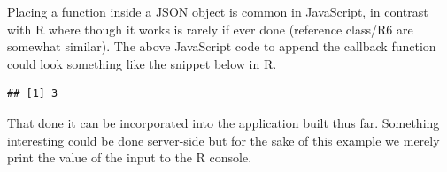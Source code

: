 \documentclass[
]{krantz}
\makeatletter
\newenvironment{Shaded}{\begin{snugshade}}{\end{snugshade}}
\newcommand{\ControlFlowTok}[1]{\textcolor[rgb]{0.27,0.27,0.27}{\textbf{#1}}}
\newcommand{\DataTypeTok}[1]{\textcolor[rgb]{0.27,0.27,0.27}{#1}}
\newcommand{\DecValTok}[1]{\textcolor[rgb]{0.06,0.06,0.06}{#1}}
\newcommand{\KeywordTok}[1]{\textcolor[rgb]{0.27,0.27,0.27}{\textbf{#1}}}
\newcommand{\NormalTok}[1]{#1}
\newcommand{\OperatorTok}[1]{\textcolor[rgb]{0.43,0.43,0.43}{\textbf{#1}}}
\newcommand{\StringTok}[1]{\textcolor[rgb]{0.5,0.5,0.5}{#1}}
\newenvironment{kframe}{%
\medskip{}
\setlength{\fboxsep}{.8em}
 \def\at@end@of@kframe{}%
 \ifinner\ifhmode%
  \def\at@end@of@kframe{\end{minipage}}%
  \begin{minipage}{\columnwidth}%
 \fi\fi%
 \def\FrameCommand##1{\hskip\@totalleftmargin \hskip-\fboxsep
 \colorbox{shadecolor}{##1}\hskip-\fboxsep
     \hskip-\linewidth \hskip-\@totalleftmargin \hskip\columnwidth}%
 \MakeFramed {\advance\hsize-\width
   \@totalleftmargin\z@ \linewidth\hsize
   \@setminipage}}%
 {\par\unskip\endMakeFramed%
 \at@end@of@kframe}
\renewenvironment{Shaded}{\begin{kframe}}{\end{kframe}}
\makeatother
\begin{document}
Placing a function inside a JSON object is common in JavaScript, in contrast with R where though it works is rarely if ever done (reference class/R6 are somewhat similar). The above JavaScript code to append the callback function could look something like the snippet below in R.

\begin{Shaded}
\end{Shaded}

\begin{verbatim}
## [1] 3
\end{verbatim}

That done it can be incorporated into the application built thus far. Something interesting could be done server-side but for the sake of this example we merely print the value of the input to the R console.
\end{document}
